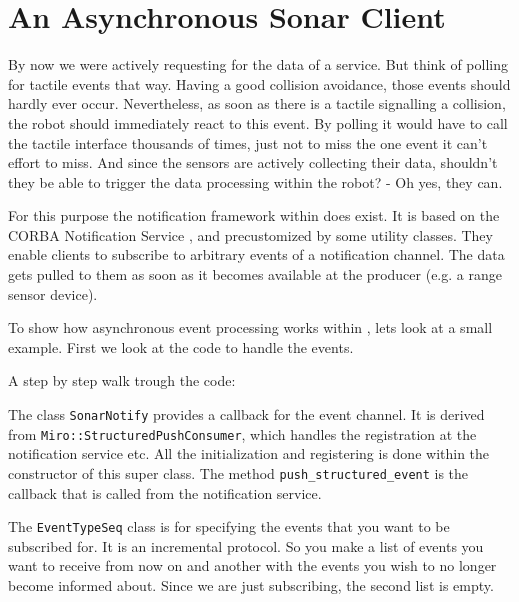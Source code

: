 
\label{lst:SonarPoll3}

\section{An Asynchronous Sonar Client}
\label{sec:notify}

By now we were actively requesting for the data of a service. But
think of polling for tactile events that way. Having a good
collision avoidance, those events should hardly ever occur.
Nevertheless, as soon as there is a tactile signalling a
collision, the robot should immediately react to this event. By
polling it would have to call the tactile interface thousands of
times, just not to miss the one event it can't effort to miss. And
since the sensors are actively collecting their data, shouldn't
they be able to trigger the data processing within the robot? - Oh
yes, they can.

For this purpose the notification framework within \miro does
exist. It is based on the CORBA Notification Service
\cite{OMG:00-5}, and precustomized by some utility classes. They
enable clients to subscribe to arbitrary events of a notification
channel. The data gets pulled to them as soon as it becomes
available at the producer (e.g. a range sensor device).

To show how asynchronous event processing works within \miro, lets
look at a small example. First we look at the code to handle the
events.


\label{lst:SonarNotify}

A step by step walk trough the code:



The class \lstinline!SonarNotify! provides a callback for the event
channel. It is derived from \lstinline!Miro::StructuredPushConsumer!,
which handles the registration at the notification service etc. All
the initialization and registering is done within the constructor of
this super class. The method \lstinline!push_structured_event! is the
callback that is called from the notification service.



The \lstinline!EventTypeSeq! class is for specifying the events that you
want to be subscribed for. It is an incremental protocol. So you make
a list of events you want to receive from now on and another with the
events you wish to no longer become informed about. Since we are just
subscribing, the second list is empty.

